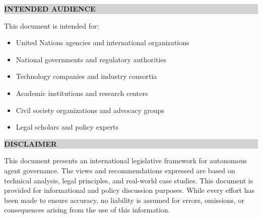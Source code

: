 \noindent\colorbox{lightgray}{%
    \parbox{\dimexpr\textwidth-2\fboxsep\relax}{%
        \vspace{10pt}
        \sffamily\small
        \textbf{\textcolor{legislativeblue}{INTENDED AUDIENCE}}
        \vspace{10pt}
    }%
}

\vspace{0.3cm}

\noindent This document is intended for:

\begin{itemize}[leftmargin=1.5cm]
    \item United Nations agencies and international organizations
    \item National governments and regulatory authorities
    \item Technology companies and industry consortia
    \item Academic institutions and research centers
    \item Civil society organizations and advocacy groups
    \item Legal scholars and policy experts
\end{itemize}

\vspace{1cm}

\noindent\colorbox{lightgray}{%
    \parbox{\dimexpr\textwidth-2\fboxsep\relax}{%
        \vspace{10pt}
        \sffamily\small
        \textbf{\textcolor{legislativeblue}{DISCLAIMER}}
        \vspace{10pt}
    }%
}

\vspace{0.3cm}

\noindent\small
This document presents an international legislative framework for autonomous agent governance. The views and recommendations expressed are based on technical analysis, legal principles, and real-world case studies. This document is provided for informational and policy discussion purposes. While every effort has been made to ensure accuracy, no liability is assumed for errors, omissions, or consequences arising from the use of this information.

\cleardoublepage
